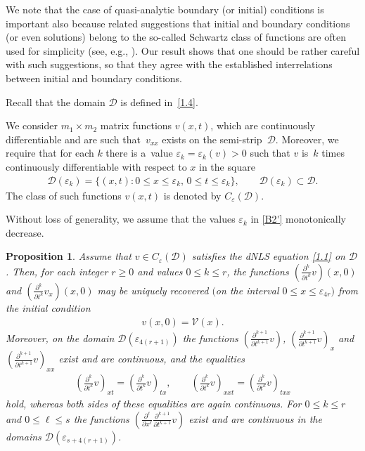 \documentclass[pdftex]{sigma}
\newtheorem{Proposition}[Theorem]{Proposition}
{\theoremstyle{definition}
\newtheorem{Definition}[Theorem]{Definition}
\newtheorem{Notation}[Theorem]{Notation}
\newtheorem{Example}[Theorem]{Example}
\newtheorem{Remark}[Theorem]{Remark}
}
\def\ve{\varepsilon}
\def\p{\partial}
\newcommand{\cD}{{\mathcal D}}
\newcommand{\cV}{{\mathcal V}}
\numberwithin{equation}{section}
\begin{document}
We note that the case of quasi-analytic boundary (or initial) conditions is important also because related suggestions
that initial and boundary conditions (or even solutions) belong to the so-called Schwartz class of functions are often used
for simplicity (see, e.g., \cite{Fok0}). Our result shows that one should be rather careful with such suggestions,
so that they agree with the established interrelations between initial and boundary conditions.


Recall that the domain $\cD$ is def\/ined in~\eqref{1.4}.

\begin{Notation}\label{NnB1}
We consider $m_1 \times m_2$ matrix functions $v(x,t)$,
which are continuously dif\/fe\-ren\-tiab\-le and are
such that~$v_{xx}$ exists
on the semi-strip~$\cD$.
Moreover, we require that for each $k$ there is a~value $\ve_k=\ve_k(v)>0$ such that $v$
is~$k$ times continuously dif\/ferentiable with respect to $x$ in the square
\begin{gather} \label{B2'}
\cD({\ve_k})=\{(x, t)\colon  0\leq x\leq \ve_k, \, 0\leq t\leq \ve_k\}, \qquad \cD({\ve_k})\subset \cD.
\end{gather}
The class of such functions $v(x,t)$ is denoted by $C_{\ve}(\cD)$.
\end{Notation}


\noindent Without loss of generality, we assume that the values $\ve_k$ in \eqref{B2'} monotonically decrease.
\begin{Proposition} \label{prequa} Assume that $v\in C_{\ve}(\cD)$ satisfies the dNLS equation \eqref{1.1} on $\cD$.
Then, for each integer $r\geq 0$ and values $0\leq k\leq r$, the functions $\left(\frac{\p^k}{\p t^k}v\right)(x,0)$ and $\left(\frac{\p^k}{\p t^k}v_x\right)(x,0)$
may be uniquely recovered $($on the interval $0\leq x\leq \ve_
{4r})$ from the initial condition
\begin{gather} \label{IC1}
v(x,0)=\cV(x).
\end{gather}
Moreover, on the domain $\cD(\ve_{4(r+1)})$ the functions $\left(\frac{\p^{k+1}}{\p t^{k+1}}v\right)$, $\left(\frac{\p^{k+1}}{\p t^{k+1}}v\right)_x$
and $\left(\frac{\p^{k+1}}{\p t^{k+1}}v\right)_{xx}$
exist and are continuous, and the equalities
\begin{gather} \label{B5}
\left(\frac{\p^k}{\p t^k}v\right)_{xt}= \left(\frac{\p^k}{\p t^k}v\right)_{tx}, \qquad
\left(\frac{\p^k}{\p t^k}v\right)_{xxt}= \left(\frac{\p^k}{\p t^k}v\right)_{txx}
\end{gather}
hold, whereas both sides of these equalities are again continuous.
 For $0\leq k\leq r$ and $0\leq \ell\leq s$ the functions $\left(\frac{\p^{\ell}}{\p x^{\ell}}\frac{\p^{k+1}}{\p t^{k+1}}v\right)$
exist and are continuous in the domains $\cD(\ve_{s+4(r+1)})$.
\end{Proposition}
\end{document}
